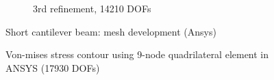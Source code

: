 \begin{figure}[h!]
\begin{subfigure}[b]{0.48\linewidth}
{        }
        \caption{3rd refinement, 14210 DOFs}
    \end{subfigure}
    \caption{Short cantilever beam: mesh development (Ansys)}
    \label{adap_fig:ex_short_cantilever_mesh_develpment_ansys}
\end{figure}

\begin{figure}
    \centering
    \caption[Von-mises stress contour using 9-node quadrilateral element in ANSYS]{Von-mises stress contour using 9-node quadrilateral element in ANSYS (17930 DOFs)}
    \label{adap_fig:ex_chole_stress_ansys}
\end{figure}
